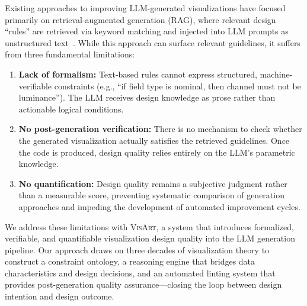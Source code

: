 \documentclass[final,5p,times,twocolumn]{elsarticle}
\newcommand{\sysname}{\textsc{VisArt}}
\newcommand{\eg}{e.g.}
\begin{document}
Existing approaches to improving LLM-generated visualizations have focused primarily on retrieval-augmented generation (RAG), where relevant design ``rules'' are retrieved via keyword matching and injected into LLM prompts as unstructured text~\cite{li2024lightva,lu2024insightlens}. While this approach can surface relevant guidelines, it suffers from three fundamental limitations:
\begin{enumerate}[label=(\arabic*)]
  \item \textbf{Lack of formalism:} Text-based rules cannot express structured, machine-verifiable constraints (\eg{}, ``if field type is nominal, then channel must not be luminance''). The LLM receives design knowledge as prose rather than actionable logical conditions.
  \item \textbf{No post-generation verification:} There is no mechanism to check whether the generated visualization actually satisfies the retrieved guidelines. Once the code is produced, design quality relies entirely on the LLM's parametric knowledge.
  \item \textbf{No quantification:} Design quality remains a subjective judgment rather than a measurable score, preventing systematic comparison of generation approaches and impeding the development of automated improvement cycles.
\end{enumerate}

We address these limitations with \sysname{}, a system that introduces formalized, verifiable, and quantifiable visualization design quality into the LLM generation pipeline. Our approach draws on three decades of visualization theory to construct a constraint ontology, a reasoning engine that bridges data characteristics and design decisions, and an automated linting system that provides post-generation quality assurance---closing the loop between design intention and design outcome.
\end{document}
